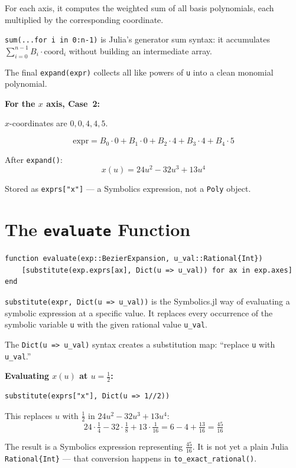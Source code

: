 \documentclass[12pt, a4paper]{article}
\newcommand{\cd}[1]{\texttt{#1}}
\begin{document}
For each axis, it computes the weighted sum of all basis polynomials,
each multiplied by the corresponding coordinate.

\cd{sum(...for i in 0:n-1)} is Julia's generator sum syntax:
it accumulates $\sum_{i=0}^{n-1} B_i \cdot \text{coord}_i$
without building an intermediate array.

The final \cd{expand(expr)} collects all like powers of \cd{u}
into a clean monomial polynomial.

\begin{examplebox}
\textbf{For the $x$ axis, Case~2:}

$x$-coordinates are $0, 0, 4, 4, 5$.

\[
  \text{expr} = B_0 \cdot 0 + B_1 \cdot 0 + B_2 \cdot 4 + B_3 \cdot 4 + B_4 \cdot 5
\]

After \cd{expand()}:
\[
  x(u) = 24u^2 - 32u^3 + 13u^4
\]

Stored as \cd{exprs["x"]} --- a Symbolics expression,
not a \cd{Poly} object.
\end{examplebox}


\section{The \texttt{evaluate} Function}

\begin{verbatim}
function evaluate(exp::BezierExpansion, u_val::Rational{Int})
    [substitute(exp.exprs[ax], Dict(u => u_val)) for ax in exp.axes]
end
\end{verbatim}

\cd{substitute(expr, Dict(u => u\_val))} is the Symbolics.jl
way of evaluating a symbolic expression at a specific value.
It replaces every occurrence of the symbolic variable \cd{u}
with the given rational value \cd{u\_val}.

The \cd{Dict(u => u\_val)} syntax creates a substitution map:
``replace \cd{u} with \cd{u\_val}.''

\begin{examplebox}
\textbf{Evaluating $x(u)$ at $u = \tfrac{1}{2}$:}

\begin{verbatim}
substitute(exprs["x"], Dict(u => 1//2))
\end{verbatim}

This replaces $u$ with $\tfrac{1}{2}$ in $24u^2 - 32u^3 + 13u^4$:
\[
  24 \cdot \tfrac{1}{4} - 32 \cdot \tfrac{1}{8} + 13 \cdot \tfrac{1}{16}
  = 6 - 4 + \tfrac{13}{16} = \tfrac{45}{16}
\]

The result is a Symbolics expression representing $\tfrac{45}{16}$.
It is not yet a plain Julia \cd{Rational\{Int\}} ---
that conversion happens in \cd{to\_exact\_rational()}.
\end{examplebox}
\end{document}
